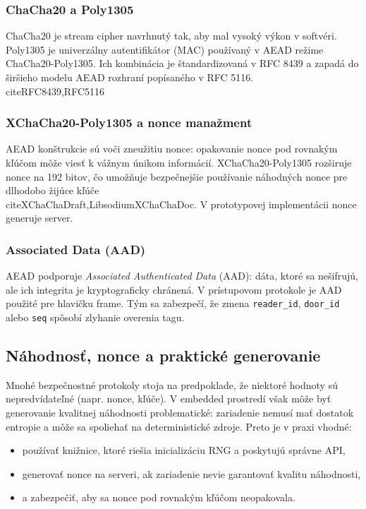 \documentclass[journal,a4paper,onecolumn]{IEEEtran}
\begin{document}
\subsubsection{ChaCha20 a Poly1305}

ChaCha20 je stream cipher navrhnutý tak, aby mal vysoký výkon v softvéri. Poly1305 je univerzálny autentifikátor (MAC) používaný v AEAD režime ChaCha20-Poly1305. Ich kombinácia je štandardizovaná v RFC 8439 a zapadá do širšieho modelu AEAD rozhraní popísaného v RFC 5116.\\cite{RFC8439,RFC5116}

\subsubsection{XChaCha20-Poly1305 a nonce manažment}

AEAD konštrukcie sú  voči zneužitiu nonce: opakovanie nonce pod rovnakým kľúčom môže viesť k vážnym únikom informácií. XChaCha20-Poly1305 rozširuje nonce na 192 bitov, čo umožňuje bezpečnejšie používanie náhodných nonce pre dlhodobo žijúce kľúče\\cite{XChaChaDraft,LibsodiumXChaChaDoc}. V prototypovej implementácii nonce generuje server.

\subsubsection{Associated Data (AAD)}

AEAD podporuje \emph{Associated Authenticated Data} (AAD): dáta, ktoré sa nešifrujú, ale ich integrita je kryptograficky chránená. V prístupovom protokole je AAD použité pre hlavičku frame. Tým sa zabezpečí, že zmena \texttt{reader\_id}, \texttt{door\_id} alebo \texttt{seq} spôsobí zlyhanie overenia tagu.

\subsection{Náhodnosť, nonce a praktické generovanie}

Mnohé bezpečnostné protokoly stoja na predpoklade, že niektoré hodnoty sú nepredvídateľné (napr. nonce, kľúče). V embedded prostredí však môže byť generovanie kvalitnej náhodnosti problematické: zariadenie nemusí mať dostatok entropie a môže sa spoliehať na deterministické zdroje. Preto je v praxi vhodné:

\begin{itemize}[leftmargin=*,itemsep=2pt]
  \item používať knižnice, ktoré riešia inicializáciu RNG a poskytujú správne API,
  \item generovať nonce na serveri, ak zariadenie nevie garantovať kvalitu náhodnosti,
  \item a zabezpečiť, aby sa nonce pod rovnakým kľúčom neopakovala.
\end{itemize}
\end{document}

